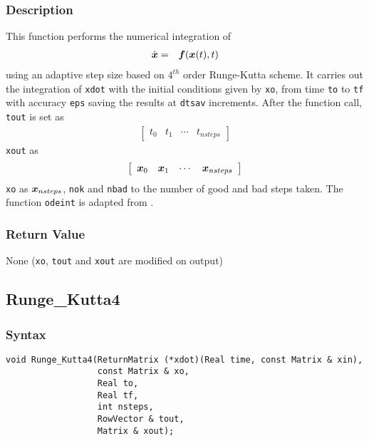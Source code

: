 \documentclass[dvips,11pt,fleqn]{report}
\newcommand{\mbold}[1]{\mbox{\boldmath $ #1 $}}
\newcommand{\matr}[2]{\left[\begin{array}{#1} #2 \end{array}\right]}
\begin{document}
\subsubsection*{Description}
This function performs the numerical integration of 
\begin{eqnarray}
\dot{\mbold{x}} & = & \mbold{f}(\mbold{x}(t),t)
\end{eqnarray}
using an adaptive step size based on $4^{th}$ order Runge-Kutta scheme.
It carries out the integration of {\tt xdot} with the initial conditions given by
{\tt xo}, from time {\tt to} to {\tt tf} with accuracy {\tt eps} saving the results at
{\tt dtsav} increments. After the function call, 
{\tt tout} is set as 
\begin{eqnarray}
\matr{cccc}{ t_0 & t_1 & \cdots & t_{nsteps}}
\end{eqnarray}
{\tt xout} as
\begin{eqnarray}
\matr{cccc}{ \mbold{x}_0 & \mbold{x}_1 & \cdots & \mbold{x}_{nsteps}}
\end{eqnarray}
{\tt xo} as $\mbold{x}_{nsteps}$, {\tt nok} and {\tt nbad} to the number of
good and bad steps taken. The function {\tt odeint} is adapted from \cite{press_flannery}.



\subsubsection*{Return Value}

None ({\tt xo}, {\tt tout} and {\tt xout} are modified on output)

\newpage

\subsection*{Runge\_Kutta4}
\subsubsection*{Syntax}
\begin{verbatim}
void Runge_Kutta4(ReturnMatrix (*xdot)(Real time, const Matrix & xin),
                  const Matrix & xo, 
                  Real to, 
                  Real tf, 
                  int nsteps,
                  RowVector & tout, 
                  Matrix & xout);
\end{verbatim}
\end{document}
